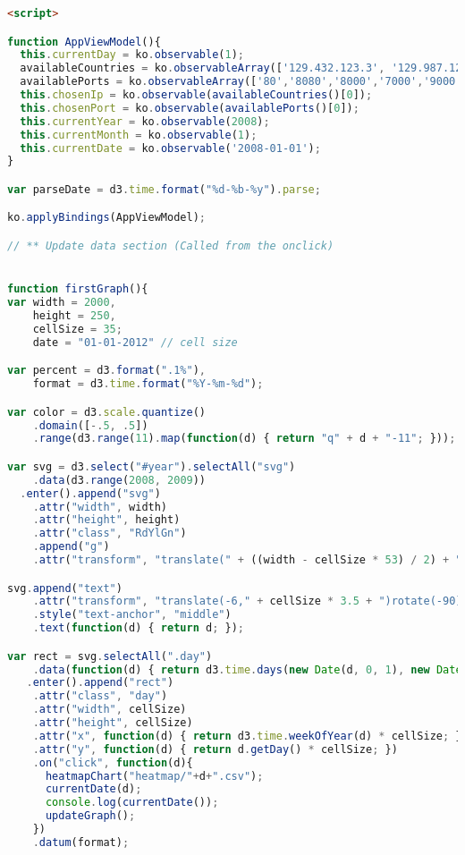 \begin{lstlisting}[language=HTML]
<script>

function AppViewModel(){
  this.currentDay = ko.observable(1);
  availableCountries = ko.observableArray(['129.432.123.3', '129.987.123.422', '987.654.432.123','456.423.0.124','126.674.234.543','129.432.123.3', '129.987.123.422', '987.654.432.123','456.423.0.124','126.674.234.543','129.432.123.3', '129.987.123.422', '987.654.432.123','456.423.0.124','126.674.234.543']);
  availablePorts = ko.observableArray(['80','8080','8000','7000','9000','8888','80','8080','8000','7000','9000','8888'])
  this.chosenIp = ko.observable(availableCountries()[0]);
  this.chosenPort = ko.observable(availablePorts()[0]);
  this.currentYear = ko.observable(2008);
  this.currentMonth = ko.observable(1);
  this.currentDate = ko.observable('2008-01-01');
}

var parseDate = d3.time.format("%d-%b-%y").parse;

ko.applyBindings(AppViewModel);

// ** Update data section (Called from the onclick)


function firstGraph(){
var width = 2000,
    height = 250,
    cellSize = 35;
    date = "01-01-2012" // cell size

var percent = d3.format(".1%"),
    format = d3.time.format("%Y-%m-%d");

var color = d3.scale.quantize()
    .domain([-.5, .5])
    .range(d3.range(11).map(function(d) { return "q" + d + "-11"; }));

var svg = d3.select("#year").selectAll("svg")
    .data(d3.range(2008, 2009))
  .enter().append("svg")
    .attr("width", width)
    .attr("height", height)
    .attr("class", "RdYlGn")
    .append("g")
    .attr("transform", "translate(" + ((width - cellSize * 53) / 2) + "," + (height - cellSize * 7 - 1) + ")");

svg.append("text")
    .attr("transform", "translate(-6," + cellSize * 3.5 + ")rotate(-90)")
    .style("text-anchor", "middle")
    .text(function(d) { return d; });

var rect = svg.selectAll(".day")
    .data(function(d) { return d3.time.days(new Date(d, 0, 1), new Date(d + 1, 0, 1)); })
   .enter().append("rect")
    .attr("class", "day")
    .attr("width", cellSize)
    .attr("height", cellSize)
    .attr("x", function(d) { return d3.time.weekOfYear(d) * cellSize; })
    .attr("y", function(d) { return d.getDay() * cellSize; })
    .on("click", function(d){
      heatmapChart("heatmap/"+d+".csv");
      currentDate(d);
      console.log(currentDate());
      updateGraph();
    })
    .datum(format);


\end{lstlisting}
